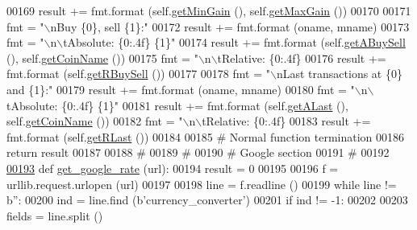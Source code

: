 \begin{DoxyCode}
{00169         result += fmt.format (self.\hyperlink{classexch2exch_1_1_differences_a110cb3a79f744b6d3911b6669b8a0a89}{getMinGain} (), self.\hyperlink{classexch2exch_1_1_differences_a3b557469ba68c3041d6ef04dc847c77b}{getMaxGain} ())
00170         
00171         fmt = \textcolor{stringliteral}{"\(\backslash\)nBuy \{0\}, sell \{1\}:"}
00172         result += fmt.format (oname, mname)
00173         fmt = \textcolor{stringliteral}{"\(\backslash\)n\(\backslash\)tAbsolute: \{0:.4f\} \{1\}"}
00174         result += fmt.format (self.\hyperlink{classexch2exch_1_1_differences_a5b1000fb221e0726fb36a8e9a0655d84}{getABuySell} (), self.\hyperlink{classexch2exch_1_1_differences_a27c3904cedfe6f58d750591c1f7c7879}{getCoinName} ())
00175         fmt = \textcolor{stringliteral}{"\(\backslash\)n\(\backslash\)tRelative: \{0:.4f\} %
00176         result += fmt.format (self.\hyperlink{classexch2exch_1_1_differences_ae360dc9692075e21d0aafa2ff1dc23d4}{getRBuySell} ())
00177         
00178         fmt = \textcolor{stringliteral}{"\(\backslash\)nLast transactions at \{0\} and \{1\}:"}
00179         result += fmt.format (oname, mname)
00180         fmt = \textcolor{stringliteral}{"\(\backslash\)n\(\backslash\)tAbsolute: \{0:.4f\} \{1\}"}
00181         result += fmt.format (self.\hyperlink{classexch2exch_1_1_differences_ae65d1f91ffad5d587a564d7160263b83}{getALast} (), self.\hyperlink{classexch2exch_1_1_differences_a27c3904cedfe6f58d750591c1f7c7879}{getCoinName} ())
00182         fmt = \textcolor{stringliteral}{"\(\backslash\)n\(\backslash\)tRelative: \{0:.4f\} %
00183         result += fmt.format (self.\hyperlink{classexch2exch_1_1_differences_ac4f1f695ff394d65cfb51ea55dc67fa5}{getRLast} ())
00184         
00185         \textcolor{comment}{# Normal function termination}
00186         \textcolor{keywordflow}{return} result
00187 
00188 \textcolor{comment}{#        }
00189 \textcolor{comment}{# }
00190 \textcolor{comment}{# Google section }
00191 \textcolor{comment}{#}
00192 
\hypertarget{exch2exch_8py_source.tex_l00193}{}\hyperlink{namespaceexch2exch_a20ad08d045d52bdcb3977eaa8f951622}{00193} \textcolor{keyword}{def }\hyperlink{namespaceexch2exch_a20ad08d045d52bdcb3977eaa8f951622}{get\_google\_rate} (url):
00194     result = 0
00195 
00196     f = urllib.request.urlopen (url)
00197     
00198     line = f.readline ()
00199     \textcolor{keywordflow}{while} line != b\textcolor{stringliteral}{''}:
00200         ind = line.find (b\textcolor{stringliteral}{'currency\_converter'})
00201         \textcolor{keywordflow}{if} ind != -1:
00202             
00203             fields = line.split ()
}}}
\end{DoxyCode}
